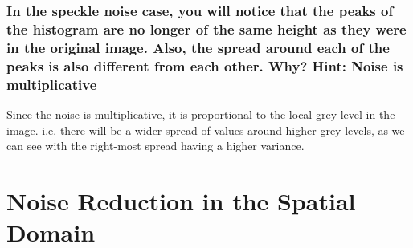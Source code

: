 \documentclass[article, 1.5space, letterpaper, 12pt, oneside, header, footer]{SydeClass}
\begin{document}
\subsubsection{In the speckle noise case, you will notice that the peaks of the histogram are no longer of the same
height as they were in the original image. Also, the spread around each of the peaks is also different
from each other. Why? Hint: Noise is multiplicative}
Since the noise is multiplicative, it is proportional to the local grey level in the image. i.e. there will be a wider spread of values around higher grey levels, as we can see with the right-most spread having a higher variance.



\section{Noise Reduction in the Spatial Domain}

\clearpage
\end{document}

